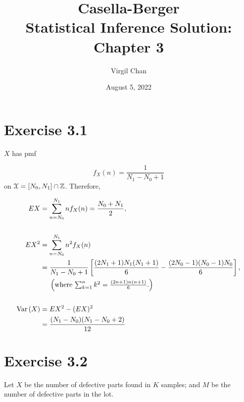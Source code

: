 \documentclass[12pt,letterpaper,reqno]{amsart}
\author{Virgil Chan}
\title{Casella-Berger \\ Statistical Inference Solution: \\ Chapter 3}
\date{August 5, 2022}
\numberwithin{equation}{subsection}
\begin{document}
\maketitle

\tableofcontents

\newpage
\section{Exercise 3.1}
$X$ has pmf

\[ f_X(n) = \frac{1}{N_1 - N_0 + 1} \]
on $\mathcal{{X}} = [N_0, N_1] \cap \mathbb{Z}$. Therefore,

\begin{align*}
    EX &= \sum_{n= N_0}^{N_1} n f_X(n) = \frac{N_0 + N_1}{2}, \\
       \\
    EX^2 &=    \sum_{n= N_0}^{N_1} n^2 f_X(n) \\
         &= \frac{1}{N_1 - N_0 + 1} \left[\frac{(2N_1 + 1)N_1(N_1 + 1)}{6} - \frac{(2N_0 - 1)(N_0 - 1)N_0}{6} \right], \\
         & \ \ \ \ \left(\mbox{where $\sum_{k=1}^n k^2 = \frac{(2n+1)n(n+1)}{6}$.}\right) \\
         \\
    \operatorname{Var}\left( {X} \right) &= EX^2 - (EX)^2 \\
            &= \frac{(N_1 - N_0)(N_1 - N_0 +2)}{12}
\end{align*}

\newpage
\section{Exercise 3.2}

Let $X$ be the number of defective parts found in $K$ samples; and $M$ be the number of defective parts in the lot.
\end{document}
